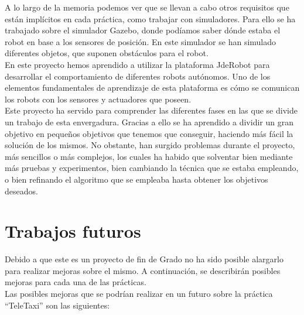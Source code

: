 A lo largo de la memoria podemos ver que se llevan a cabo otros requisitos que están implícitos en cada práctica, como trabajar con simuladores. Para ello se ha trabajado sobre el simulador Gazebo, donde podíamos saber dónde estaba el robot en base a los sensores de posición. En este simulador se han simulado diferentes objetos, que suponen obstáculos para el robot.\\

En este proyecto hemos aprendido a utilizar la plataforma JdeRobot para desarrollar el comportamiento de diferentes robots autónomos. Uno de los elementos fundamentales de aprendizaje de esta plataforma es cómo se comunican los robots con los sensores y actuadores que poseen. \\

Este proyecto ha servido para comprender las diferentes fases en las que se divide un trabajo de esta envergadura. Gracias a ello se ha aprendido a dividir un gran objetivo en pequeños objetivos que tenemos que conseguir, haciendo más fácil la solución de los mismos. No obstante, han surgido problemas durante el proyecto, más sencillos o más complejos, los cuales ha habido que solventar bien mediante más pruebas y experimentos, bien cambiando la técnica que se estaba empleando, o bien refinando el algoritmo que se empleaba hasta obtener los objetivos deseados.

\section{Trabajos futuros}
Debido a que este es un proyecto de fin de Grado no ha sido posible alargarlo para realizar mejoras sobre el mismo. A continuación, se describirán posibles mejoras para cada una de las prácticas.\\

Las posibles mejoras que se podrían realizar en un futuro sobre la práctica ``TeleTaxi'' son las siguientes:

